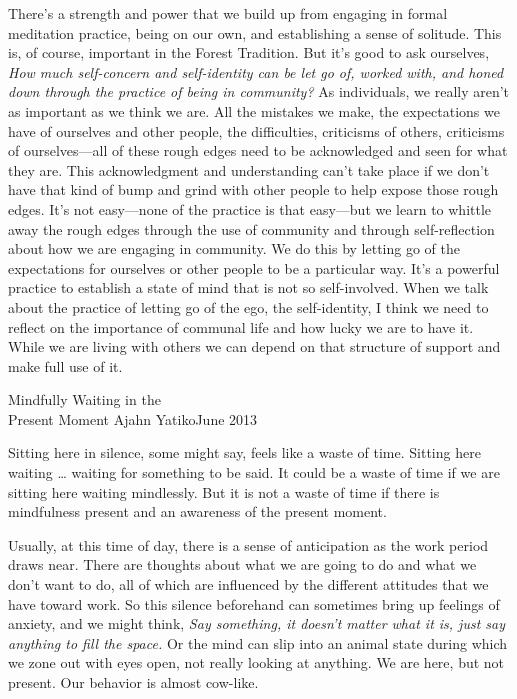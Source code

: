 There's a strength and power that we build up from engaging in formal 
meditation practice, being on our own, and establishing a sense of 
solitude. This is, of course, important in the Forest Tradition. But 
it's good to ask ourselves, \emph{How much self-concern and 
self-identity can be let go of, worked with, and honed down through the 
practice of being in community?} As individuals, we really aren't as 
important as we think we are. All the mistakes we make, the 
expectations we have of ourselves and other people, the difficulties, 
criticisms of others, criticisms of ourselves---all of these rough 
edges need to be acknowledged and seen for what they are. This 
acknowledgment and understanding can't take place if we don't have that 
kind of bump and grind with other people to help expose those rough 
edges. It's not easy---none of the practice is that easy---but we learn 
to whittle away the rough edges through the use of community and 
through self-reflection about how we are engaging in community. We do 
this by letting go of the expectations for ourselves or other people to 
be a particular way. It's a powerful practice to establish a state of 
mind that is not so self-involved. When we talk about the practice of 
letting go of the ego, the self-identity, I think we need to reflect on 
the importance of communal life and how lucky we are to have it. While 
we are living with others we can depend on that structure of support 
and make full use of it.

{Mindfully Waiting in the\\Present Moment}
{Ajahn Yatiko}{June 2013}

Sitting here in silence, some might say, feels like a waste of time. 
Sitting here waiting \ldots{} waiting for something to be said. It 
could be a waste of time if we are sitting here waiting mindlessly. But 
it is not a waste of time if there is mindfulness present and an 
awareness of the present moment.

Usually, at this time of day, there is a sense of anticipation as the 
work period draws near. There are thoughts about what we are going to 
do and what we don't want to do, all of which are influenced by the 
different attitudes that we have toward work. So this silence 
beforehand can sometimes bring up feelings of anxiety, and we might 
think, \emph{Say something, it doesn't matter what it is, just say 
anything to fill the space.} Or the mind can slip into an animal state 
during which we zone out with eyes open, not really looking at 
anything. We are here, but not present. Our behavior is almost cow-like.

